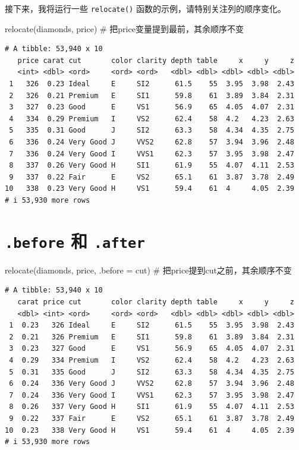 \documentclass[
  letterpaper,
]{ctexbook}
\newenvironment{Shaded}{\begin{snugshade}}{\end{snugshade}}
\newcommand{\AttributeTok}[1]{\textcolor[rgb]{0.40,0.45,0.13}{#1}}
\newcommand{\CommentTok}[1]{\textcolor[rgb]{0.37,0.37,0.37}{#1}}
\newcommand{\FunctionTok}[1]{\textcolor[rgb]{0.28,0.35,0.67}{#1}}
\newcommand{\NormalTok}[1]{\textcolor[rgb]{0.00,0.23,0.31}{#1}}
\begin{document}
接下来，我将运行一些 \texttt{relocate()}
函数的示例，请特别关注列的顺序变化。

\begin{Shaded}
\begin{Highlighting}[]
\FunctionTok{relocate}\NormalTok{(diamonds, price) }\CommentTok{\# 把price变量提到最前，其余顺序不变}
\end{Highlighting}
\end{Shaded}

\begin{verbatim}
# A tibble: 53,940 x 10
   price carat cut       color clarity depth table     x     y     z
   <int> <dbl> <ord>     <ord> <ord>   <dbl> <dbl> <dbl> <dbl> <dbl>
 1   326  0.23 Ideal     E     SI2      61.5    55  3.95  3.98  2.43
 2   326  0.21 Premium   E     SI1      59.8    61  3.89  3.84  2.31
 3   327  0.23 Good      E     VS1      56.9    65  4.05  4.07  2.31
 4   334  0.29 Premium   I     VS2      62.4    58  4.2   4.23  2.63
 5   335  0.31 Good      J     SI2      63.3    58  4.34  4.35  2.75
 6   336  0.24 Very Good J     VVS2     62.8    57  3.94  3.96  2.48
 7   336  0.24 Very Good I     VVS1     62.3    57  3.95  3.98  2.47
 8   337  0.26 Very Good H     SI1      61.9    55  4.07  4.11  2.53
 9   337  0.22 Fair      E     VS2      65.1    61  3.87  3.78  2.49
10   338  0.23 Very Good H     VS1      59.4    61  4     4.05  2.39
# i 53,930 more rows
\end{verbatim}

\hypertarget{before-ux548c-.after}{%
\section{\texorpdfstring{\texttt{.before} 和
\texttt{.after}}{.before 和 .after}}\label{before-ux548c-.after}}

\begin{Shaded}
\begin{Highlighting}[]
\FunctionTok{relocate}\NormalTok{(diamonds, price, }\AttributeTok{.before =}\NormalTok{ cut) }\CommentTok{\# 把price提到cut之前，其余顺序不变}
\end{Highlighting}
\end{Shaded}

\begin{verbatim}
# A tibble: 53,940 x 10
   carat price cut       color clarity depth table     x     y     z
   <dbl> <int> <ord>     <ord> <ord>   <dbl> <dbl> <dbl> <dbl> <dbl>
 1  0.23   326 Ideal     E     SI2      61.5    55  3.95  3.98  2.43
 2  0.21   326 Premium   E     SI1      59.8    61  3.89  3.84  2.31
 3  0.23   327 Good      E     VS1      56.9    65  4.05  4.07  2.31
 4  0.29   334 Premium   I     VS2      62.4    58  4.2   4.23  2.63
 5  0.31   335 Good      J     SI2      63.3    58  4.34  4.35  2.75
 6  0.24   336 Very Good J     VVS2     62.8    57  3.94  3.96  2.48
 7  0.24   336 Very Good I     VVS1     62.3    57  3.95  3.98  2.47
 8  0.26   337 Very Good H     SI1      61.9    55  4.07  4.11  2.53
 9  0.22   337 Fair      E     VS2      65.1    61  3.87  3.78  2.49
10  0.23   338 Very Good H     VS1      59.4    61  4     4.05  2.39
# i 53,930 more rows
\end{verbatim}
\end{document}

